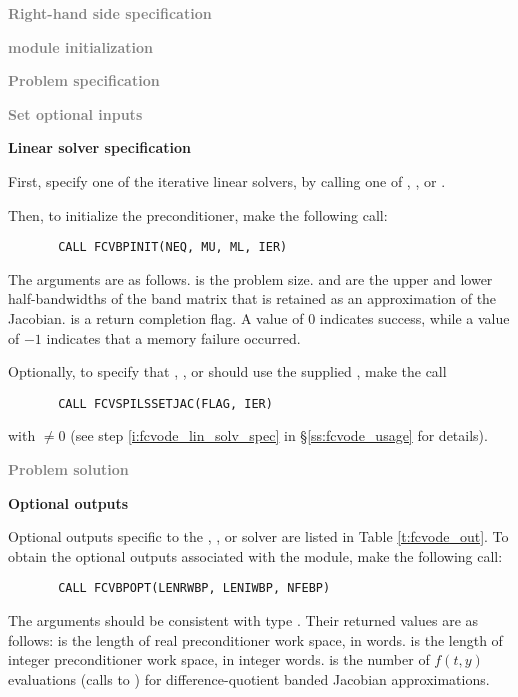 \begin{Steps}
  
\item \textcolor{gray}{\bf Right-hand side specification}

\item \textcolor{gray}{\bf {\nvector} module initialization}

\item \textcolor{gray}{\bf Problem specification}

\item \textcolor{gray}{\bf Set optional inputs}

\item {\bf Linear solver specification}

  First, specify one of the {\cvspils} iterative linear solvers, by calling
  one of , , or .

  Then, to initialize the {\cvbandpre} preconditioner, make the following call:
\begin{verbatim}
       CALL FCVBPINIT(NEQ, MU, ML, IER)
\end{verbatim}
  The arguments are as follows.
   is the problem size.
   and  are the upper and lower half-bandwidths of the band matrix
  that  is retained as an approximation of the Jacobian.
   is a return completion flag.  A value of $0$ indicates success, while 
  a value of $-1$ indicates that a memory failure occurred.
    
  Optionally, to specify that {\spgmr}, {\spbcg}, or {\sptfqmr} should use 
  the supplied , make the call
\begin{verbatim}
       CALL FCVSPILSSETJAC(FLAG, IER)
\end{verbatim}
  with  $\neq 0$ 
  (see step \ref{i:fcvode_lin_solv_spec} in \S\ref{ss:fcvode_usage} for details).
  
\item \textcolor{gray}{\bf Problem solution}
  
\item {\bf {\cvbandpre} Optional outputs}
  
  Optional outputs specific to the {\spgmr}, {\spbcg}, or {\sptfqmr} solver are 
  listed in Table \ref{t:fcvode_out}.
  To obtain the optional outputs associated with the {\cvbandpre} module, make
  the following call:
\begin{verbatim}
       CALL FCVBPOPT(LENRWBP, LENIWBP, NFEBP)
\end{verbatim}
  The arguments should be consistent with {\CC} type .  Their
  returned values are as follows:
   is the length of real preconditioner work space, in 
  words.  is the length of integer preconditioner work space, in
  integer words.  is the number of $f(t,y)$ evaluations (calls to
  ) for difference-quotient banded Jacobian approximations.
  

\end{Steps}
